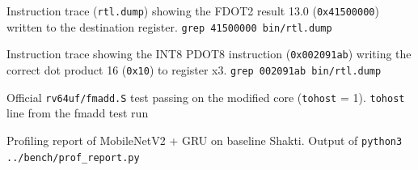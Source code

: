   {Instruction trace (\texttt{rtl.dump}) showing the FDOT2 result 13.0
   (\texttt{0x41500000}) written to the destination register.}
  {\texttt{grep 41500000 bin/rtl.dump}}

  {Instruction trace showing the INT8 PDOT8 instruction (\texttt{0x002091ab})
   writing the correct dot product 16 (\texttt{0x10}) to register x3.}
  {\texttt{grep 002091ab bin/rtl.dump}}

  {Official \texttt{rv64uf/fmadd.S} test passing on the modified core
   (\texttt{tohost} = 1).}
  {\texttt{tohost} line from the fmadd test run}

  {Profiling report of MobileNetV2 + GRU on baseline Shakti.}
  {Output of \texttt{python3 ../bench/prof\_report.py}}
